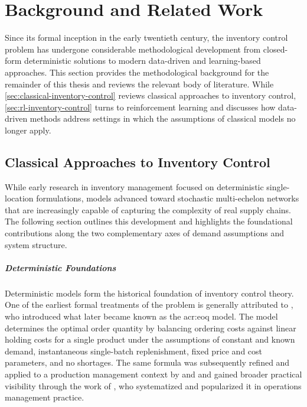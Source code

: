 \chapter{Background and Related Work}
\label{chap:background-and-related-work}

Since its formal inception in the early twentieth century, the inventory control problem has undergone considerable methodological development from closed-form deterministic solutions to modern data-driven and learning-based approaches. This section provides the methodological background for the remainder of this thesis and reviews the relevant body of literature. While \autoref{sec:classical-inventory-control} reviews classical approaches to inventory control, \autoref{sec:rl-inventory-control} turns to reinforcement learning and discusses how data-driven methods address settings in which the assumptions of classical models no longer apply.\\

\section{Classical Approaches to Inventory Control}
\label{sec:classical-inventory-control}

While early research in inventory management focused on deterministic single-location formulations, models advanced toward stochastic multi-echelon networks that are increasingly capable of capturing the complexity of real supply chains. The following section outlines this development and highlights the foundational contributions along the two complementary axes of demand assumptions and system structure.

\paragraph{\textbf{Deterministic Foundations}} Deterministic models form the historical foundation of inventory control theory. One of the earliest formal treatments of the problem is generally attributed to \citet{harris1913eoq}, who introduced what later became known as the \gls{acr:eoq} model. The model determines the optimal order quantity by balancing ordering costs against linear holding costs for a single product under the assumptions of constant and known demand, instantaneous single-batch replenishment, fixed price and cost parameters, and no shortages. The same formula was subsequently refined and applied to a production management context by \citet{camp1922eoq} and \citet{andler1929eoq} and gained broader practical visibility through the work of \citet{wilson1934eoq}, who systematized and popularized it in operations management practice. 

